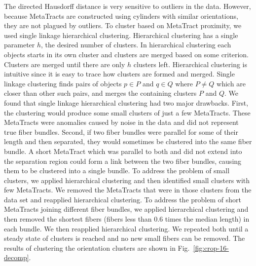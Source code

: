 The directed Hausdorff distance is very sensitive to outliers in the data.
However, because MetaTracts are constructed using cylinders with similar orientations, they are not plagued by outliers.
To cluster based on MetaTract proximity, we used single linkage hierarchical clustering.
Hierarchical clustering has a single parameter $h$, the desired number of clusters.
In hierarchical clustering each objects starts in its own cluster and clusters are merged based on some criterion.
Clusters are merged until there are only $h$ clusters left.
Hierarchical clustering is intuitive since it is easy to trace how clusters are formed and merged.
Single linkage clustering finds pairs of objects $p \in P$ and $q \in Q$ where $P \neq Q$ which are closer than other such pairs, and merges the containing clusters $P$ and $Q$.
We found that single linkage hierarchical clustering had two major drawbacks.
First, the clustering would produce some small clusters of just a few MetaTracts.
These MetaTracts were anomalies caused by noise in the data and did not represent true fiber bundles.
Second, if two fiber bundles were parallel for some of their length and then separated, they would sometimes be clustered into the same fiber bundle.
A short MetaTract which was parallel to both and did not extend into the separation region could form a link between the two fiber bundles, causing them to be clustered into a single bundle.
To address the problem of small clusters, we applied hierarchical clustering and then identified small clusters with few MetaTracts.
We removed the MetaTracts that were in those clusters from the data set and reapplied hierarchical clustering.
To address the problem of short MetaTracts joining different fiber bundles, we applied hierarchical clustering and then removed the
shortest fibers (fibers less than 0.6 times the median length) in each bundle. We then reapplied hierarchical clustering.
We repeated both until a steady state of clusters is reached and no new small fibers can be removed. The results of clustering the orientation clusters are shown in Fig.~\ref{fig:crop-16-decomp}.
  
  
  
